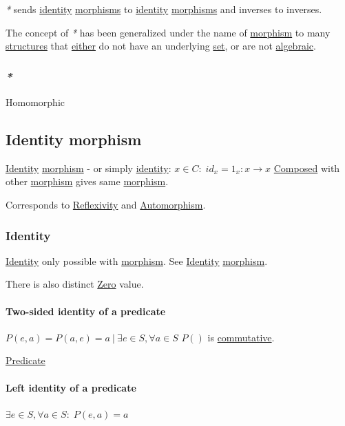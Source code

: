 \documentclass[a4paper,14pt,oneside]{book}
\begin{document}
\emph{*} sends \hyperref[orgc014b57]{identity} \hyperref[org46b4110]{morphisms} to \hyperref[orgc014b57]{identity} \hyperref[org46b4110]{morphisms} and inverses to inverses.

The concept of \emph{*} has been generalized under the name of \hyperref[org60b7530]{morphism} to many \hyperref[orgdb661ac]{structures} that \hyperref[orga6f38ad]{either} do not have an underlying \hyperref[org128a409]{set}, or are not \hyperref[orge96ff6d]{algebraic}.

\subsubsection{\emph{*}}
\label{sec:orgb0ef574}

\label{orge70ec84}Homomorphic

\subsection{\label{org28c3191}Identity morphism}
\label{sec:org8102083}
\hyperref[orgc014b57]{Identity} \hyperref[org60b7530]{morphism} - or simply \hyperref[orgc014b57]{identity}: \(x \in C : \; id_{x}=1_{x} : x \to x\)
\hyperref[org8a0eae0]{Composed} with other \hyperref[org60b7530]{morphism} gives same \hyperref[org60b7530]{morphism}.

Corresponds to \hyperref[org18bd877]{Reflexivity} and \hyperref[org8a49b06]{Automorphism}.

\subsubsection{\label{orgc014b57}Identity}
\label{sec:org31a93c3}
\hyperref[orgc014b57]{Identity} only possible with \hyperref[org60b7530]{morphism}. See \hyperref[orgc014b57]{Identity} \hyperref[org60b7530]{morphism}.

There is also distinct \hyperref[org4be9d1e]{Zero} value.

\paragraph{\label{orga5fb99f}Two-sided identity of a predicate}
\label{sec:orga1ff273}
\(P(e,a)=P(a,e)=a \ | \ \exists e \in S, \forall a \in S\)
\(P()\) is \hyperref[orga351a75]{commutative}.

\hyperref[org5e1d718]{Predicate}

\paragraph{\label{org890ff79}Left identity of a predicate}
\label{sec:org9432a15}
\(\exists e \in S, \forall a \in S : \; P(e,a)=a\)
\end{document}
